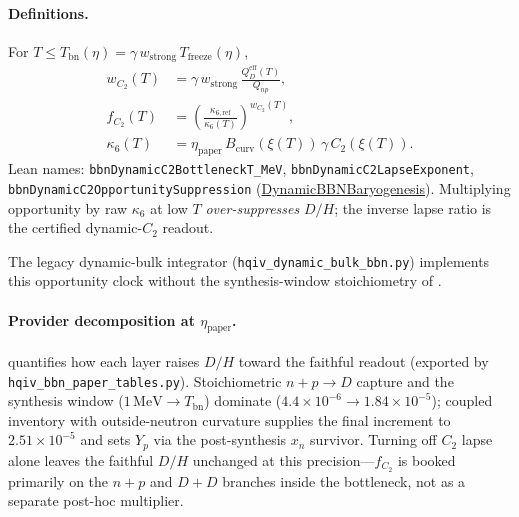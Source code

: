 \documentclass[11pt]{amsart}
\newcommand{\etap}{\ensuremath{\eta_{\mathrm{paper}}}}
\newcommand{\leanid}[1]{\nolinkurl{#1}}
\begin{document}
\paragraph{Definitions.}
For $T\le T_{\mathrm{bn}}(\eta)=\gamma\,w_{\mathrm{strong}}\,T_{\mathrm{freeze}}(\eta)$,
\[
\begin{aligned}
w_{C_2}(T) &= \gamma\,w_{\mathrm{strong}}\,\frac{Q_D^{\mathrm{eff}}(T)}{Q_{np}}, \\
f_{C_2}(T) &= \left(\frac{\kappa_{6,\mathrm{ref}}}{\kappa_6(T)}\right)^{w_{C_2}(T)}, \\
\kappa_6(T) &= \etap\,B_{\mathrm{curv}}(\xi(T))\,\gamma\,C_2(\xi(T)).
\end{aligned}
\]
Lean names: \leanid{bbnDynamicC2BottleneckT\_MeV},
\leanid{bbnDynamicC2LapseExponent},
\leanid{bbnDynamicC2OpportunitySuppression}
(\hyperref[lean:bbn-dynamic-c2]{DynamicBBNBaryogenesis}).
Multiplying opportunity by raw $\kappa_6$ at low $T$ \emph{over-suppresses}
$D/H$; the inverse lapse ratio is the certified dynamic-$C_2$ readout.

The legacy dynamic-bulk integrator (\texttt{hqiv\_dynamic\_bulk\_bbn.py})
implements this opportunity clock without the synthesis-window stoichiometry of
.
\paragraph{Provider decomposition at \etap.}
 quantifies how each layer raises $D/H$ toward
the faithful readout (exported by \texttt{hqiv\_bbn\_paper\_tables.py}).
Stoichiometric $n\!+\!p\!\to\!D$ capture and the synthesis window
($1\,\mathrm{MeV}\to T_{\mathrm{bn}}$) dominate ($4.4\times10^{-6}\to
1.84\times10^{-5}$); coupled inventory with outside-neutron curvature supplies
the final increment to $2.51\times10^{-5}$ and sets $Y_p$ via the
post-synthesis $x_n$ survivor.  Turning off $C_2$ lapse alone leaves the
faithful $D/H$ unchanged at this precision---$f_{C_2}$ is booked primarily on
the $n\!+\!p$ and $D\!+\!D$ branches inside the bottleneck, not as a separate
post-hoc multiplier.
\end{document}

